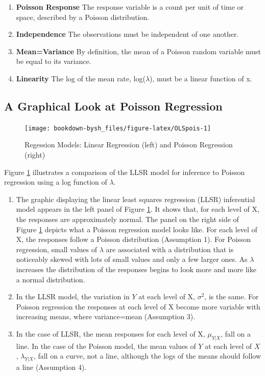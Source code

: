 \documentclass[
]{krantz}
\providecommand{\tightlist}{%
  \setlength{\itemsep}{0pt}\setlength{\parskip}{0pt}}
\begin{document}
\begin{enumerate}
\def\labelenumi{\arabic{enumi}.}
\tightlist
\item
  \textbf{Poisson Response} The response variable is a count per unit of time or space, described by a Poisson distribution.
\item
  \textbf{Independence} The observations must be independent of one another.
\item
  \textbf{Mean=Variance} By definition, the mean of a Poisson random variable must be equal to its variance.
\item
  \textbf{Linearity} The log of the mean rate, log(\(\lambda\)), must be a linear function of x.
\end{enumerate}

\hypertarget{a-graphical-look-at-poisson-regression}{%
\subsection{A Graphical Look at Poisson Regression}\label{a-graphical-look-at-poisson-regression}}

\begin{figure}

{\centering \texttt{[image: bookdown-bysh\_files/figure-latex/OLSpois-1]} 

}

\caption{Regession Models: Linear Regression (left) and Poisson Regression (right)}\label{fig:OLSpois}
\end{figure}

Figure \ref{fig:OLSpois} illustrates a comparison of the LLSR model for inference to Poisson regression using a log function of \(\lambda\).

\begin{enumerate}
\def\labelenumi{\arabic{enumi}.}
\tightlist
\item
  The graphic displaying the linear least squares regression (LLSR) inferential model appears in the left panel of Figure \ref{fig:OLSpois}. It shows that, for each level of X, the responses are approximately normal. The panel on the right side of Figure \ref{fig:OLSpois} depicts what a Poisson regression model looks like. For each level of X, the responses follow a Poisson distribution (Assumption 1). For Poisson regression, small values of \(\lambda\) are associated with a distribution that is noticeably skewed with lots of small values and only a few larger ones. As \(\lambda\) increases the distribution of the responses begins to look more and more like a normal distribution.
\item
  In the LLSR model, the variation in \(Y\) at each level of X, \(\sigma^2\), is the same. For Poisson regression the responses at each level of X become more variable with increasing means, where variance=mean (Assumption 3).
\item
  In the case of LLSR, the mean responses for each level of X, \(\mu_{Y|X}\), fall on a line. In the case of the Poisson model, the mean values of \(Y\) at each level of \(X\), \(\lambda_{Y|X}\), fall on a curve, not a line, although the logs of the means should follow a line (Assumption 4).
\end{enumerate}
\end{document}
